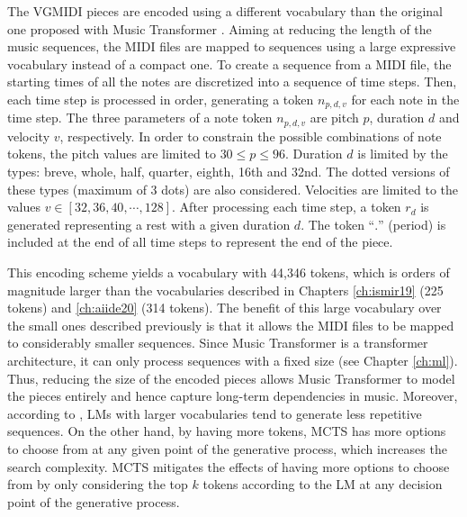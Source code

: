 The VGMIDI pieces are encoded using a different vocabulary than the original one proposed with Music Transformer \cite{huang2018music}. Aiming at reducing the length of the music sequences, the MIDI files are mapped to sequences using a large expressive vocabulary instead of a compact one. To create a sequence from a MIDI file, the starting times of all the notes are discretized into a sequence of time steps. Then, each time step is processed in order, generating a token $n_{p, d, v}$ for each note in the time step. The three parameters of a note token $n_{p, d, v}$ are pitch $p$, duration $d$ and velocity $v$, respectively. In order to constrain the possible combinations of note tokens, the pitch values are limited to $30 \leq p \leq 96$. Duration $d$ is limited by the types: breve, whole, half, quarter, eighth, 16th and 32nd. The dotted versions of these types (maximum of 3 dots) are also considered. Velocities are limited to the values $v \in [32, 36, 40, \cdots, 128]$. After processing each time step, a token $r_d$ is generated representing a rest with a given duration $d$. The token ``$.$'' (period) is included at the end of all time steps to represent the end of the piece.

This encoding scheme yields a vocabulary with 44,346 tokens, which is orders of magnitude larger than the vocabularies described in Chapters \ref{ch:ismir19} (225 tokens) and \ref{ch:aiide20} (314 tokens). The benefit of this large vocabulary over the small ones described previously is that it allows the MIDI files to be mapped to considerably smaller sequences.  Since Music Transformer is a transformer architecture, it can only process sequences with a fixed size (see Chapter \ref{ch:ml}). Thus, reducing the size of the encoded pieces allows Music Transformer to model the pieces entirely and hence capture long-term dependencies in music. Moreover, according to \citet{holtzman2018learning}, LMs with larger vocabularies tend to generate less repetitive sequences. On the other hand, by having more tokens, MCTS has more options to choose from at any given point of the generative process, which increases the search complexity. MCTS mitigates the effects of having more options to choose from by only considering the top $k$ tokens according to the LM at any decision point of the generative process.


